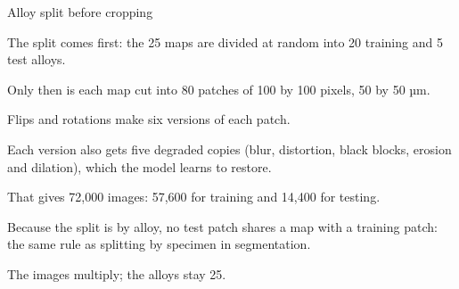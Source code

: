 \begin{frame}[source={Liao et al.\ (2026), Nat.\ Commun.\ 17, 11232, Results and Methods}]{Alloy split before cropping}
{    The split comes first: the 25 maps are divided at random into 20 training and 5 test alloys.\par
    Only then is each map cut into 80 patches of 100 by 100 pixels, 50 by 50 µm.\par
    Flips and rotations make six versions of each patch.\par
    Each version also gets five degraded copies (blur, distortion, black blocks, erosion and dilation),
      which the model learns to restore.\par
    That gives 72,000 images: 57,600 for training and 14,400 for testing.\par
    Because the split is by alloy, no test patch shares a map with a training patch: the same rule as
      splitting by specimen in segmentation.\par
    The images multiply; the alloys stay 25.}
\end{frame}

